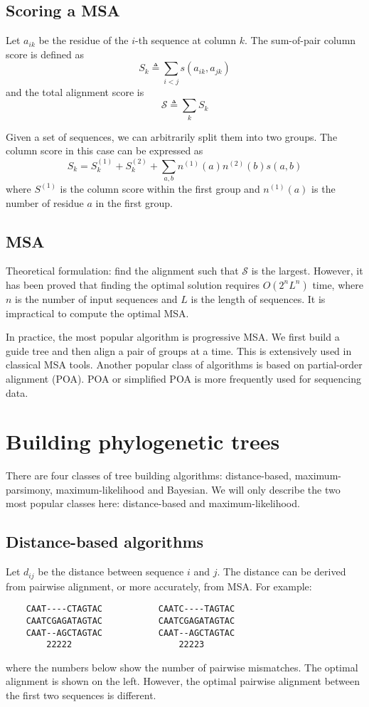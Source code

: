 \documentclass[10pt]{article}
\begin{document}
\subsection{Scoring a MSA}

Let $a_{ik}$ be the residue of the $i$-th sequence at column $k$. The
sum-of-pair column score is defined as
$$
S_k\triangleq\sum_{i<j}s(a_{ik},a_{jk})
$$
and the total alignment score is
$$
\mathcal{S}\triangleq\sum_k S_k
$$

Given a set of sequences, we can arbitrarily split them into two groups. The
column score in this case can be expressed as
$$
S_k=S^{(1)}_k+S^{(2)}_k+\sum_{a,b}n^{(1)}(a)n^{(2)}(b)s(a,b)
$$
where $S^{(1)}$ is the column score within the first group and $n^{(1)}(a)$ is
the number of residue $a$ in the first group.

\subsection{MSA}

Theoretical formulation: find the alignment such that $\mathcal{S}$ is the
largest. However, it has been proved that finding the optimal solution requires
$O(2^nL^n)$ time, where $n$ is the number of input sequences and $L$ is the
length of sequences. It is impractical to compute the optimal MSA.

In practice, the most popular algorithm is progressive MSA. We first build a
guide tree and then align a pair of groups at a time. This is extensively used
in classical MSA tools. Another popular class of algorithms is based on
partial-order alignment (POA). POA or simplified POA is more frequently used
for sequencing data.

\newpage

\section{Building phylogenetic trees}

There are four classes of tree building algorithms: distance-based,
maximum-parsimony, maximum-likelihood and Bayesian. We will only describe the
two most popular classes here: distance-based and maximum-likelihood.

\subsection{Distance-based algorithms}

Let $d_{ij}$ be the distance between sequence $i$ and $j$. The distance can be
derived from pairwise alignment, or more accurately, from MSA. For example:
\begin{verbatim}
    CAAT----CTAGTAC           CAATC----TAGTAC
    CAATCGAGATAGTAC           CAATCGAGATAGTAC
    CAAT--AGCTAGTAC           CAAT--AGCTAGTAC
        22222                     22223
\end{verbatim}
where the numbers below show the number of pairwise mismatches. The optimal
alignment is shown on the left. However, the optimal pairwise alignment between
the first two sequences is different.
\end{document}
